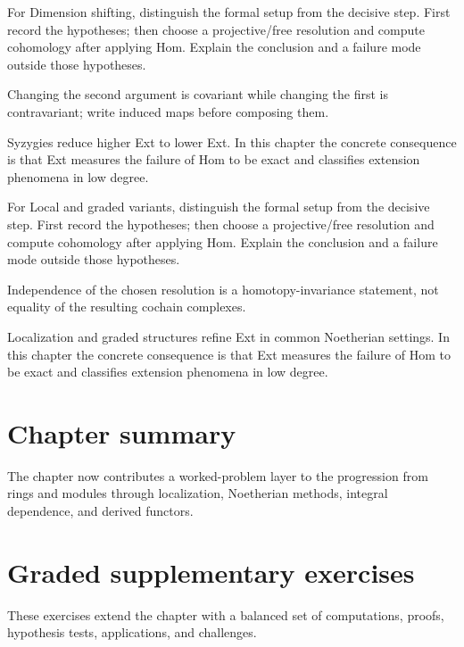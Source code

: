 \begin{exercise}\label{exr:v27-07}
For Dimension shifting, distinguish the formal setup from the decisive step. First record the hypotheses; then choose a projective/free resolution and compute cohomology after applying Hom. Explain the conclusion and a failure mode outside those hypotheses.
\end{exercise}
\begin{hint}
Changing the second argument is covariant while changing the first is contravariant; write induced maps before composing them.
\end{hint}
\begin{solution}
Syzygies reduce higher Ext to lower Ext. In this chapter the concrete consequence is that Ext measures the failure of Hom to be exact and classifies extension phenomena in low degree.
\end{solution}

\begin{exercise}\label{exr:v27-08}
For Local and graded variants, distinguish the formal setup from the decisive step. First record the hypotheses; then choose a projective/free resolution and compute cohomology after applying Hom. Explain the conclusion and a failure mode outside those hypotheses.
\end{exercise}
\begin{hint}
Independence of the chosen resolution is a homotopy-invariance statement, not equality of the resulting cochain complexes.
\end{hint}
\begin{solution}
Localization and graded structures refine Ext in common Noetherian settings. In this chapter the concrete consequence is that Ext measures the failure of Hom to be exact and classifies extension phenomena in low degree.
\end{solution}

\section*{Chapter summary}
The chapter now contributes a worked-problem layer to the progression from rings and modules through localization, Noetherian methods, integral dependence, and derived functors.
\section{Graded supplementary exercises}
These exercises extend the chapter with a balanced set of computations, proofs, hypothesis tests, applications, and challenges.

